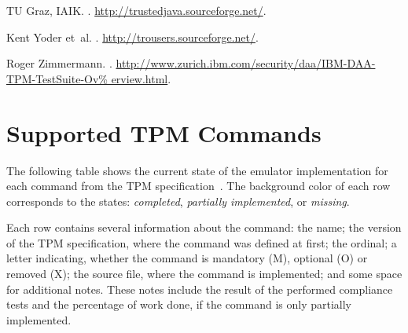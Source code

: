 \documentclass[runningheads]{llncs}
\begin{document}
\begin{thebibliography}{10}
{TU Graz, IAIK}.
.
\newblock \newline\url{http://trustedjava.sourceforge.net/}.

Kent Yoder et~al.
.
\newblock \newline\url{http://trousers.sourceforge.net/}.

Roger Zimmermann.
.
\newblock
  \newline\url{http://www.zurich.ibm.com/security/daa/IBM-DAA-TPM-TestSuite-Ov%
erview.html}.

\end{thebibliography}

\appendix

\section{Supported TPM Commands}\label{app:commands}
\newcommand{\tpmred}{tpmgray!10!red!50!white}
\newcommand{\tpmyellow}{tpmgray!10!yellow!50!white}
\newcommand{\tpmgreen}{tpmgray!10!green!50!white}
\newcommand{\tpmcolor}{tpmgray}

\newcommand{\tpmcmd}[6]{
	\begin{tabular}{p{4.5cm}|p{0.35cm}|p{0.4cm}|p{0.25cm}|p{2.5cm}|p{2cm}}
		\rowcolor{\tpmcolor}
			{\scriptsize\textsf{#1}} &
			{\scriptsize\textsf{#2}} &
			{\scriptsize\makebox[0.4cm][r]{#3}} &
			{\scriptsize\makebox[0.25cm][c]{#4}} &
			{\scriptsize\texttt{#5}} &
			{\scriptsize #6}\\
	\end{tabular}
}
\newcommand{\tpmcmdr}[6]{
	\renewcommand{\tpmcolor}{\tpmred}
	\tpmcmd{#1}{#2}{#3}{#4}{#5}{#6}
	\renewcommand{\tpmcolor}{tpmgray}
}
\newcommand{\tpmcmdg}[6]{
	\renewcommand{\tpmcolor}{\tpmgreen}
	\tpmcmd{#1}{#2}{#3}{#4}{#5}{#6}
	\renewcommand{\tpmcolor}{tpmgray}
}
\newcommand{\tpmcmdy}[6]{
	\renewcommand{\tpmcolor}{\tpmyellow}
	\tpmcmd{#1}{#2}{#3}{#4}{#5}{#6}
	\renewcommand{\tpmcolor}{tpmgray}
}
The following table shows the current state of the emulator implementation
for each command from the TPM specification~\cite{TPM}. The background color
of each row corresponds to the states:
\colorbox{\tpmgreen}{\emph{completed}},
\colorbox{\tpmyellow}{\emph{partially implemented}}, or
\colorbox{\tpmred}{\emph{missing}}.

Each row contains several information about the command:
the name;
the version of the TPM specification, where the command was defined at first;
the ordinal;
a letter indicating, whether the command is mandatory (M), optional (O) or
removed (X);
the source file, where the command is implemented;
and some space for additional notes.
These notes include the result of the performed compliance tests and the
percentage of work done, if the command is only partially implemented.
\end{document}
